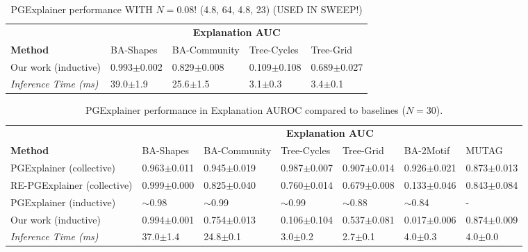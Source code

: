 \begin{table}[ht]
    \centering
    \scriptsize
    \begin{tabularx}{\textwidth}{l*{4}{X}}   %
    \toprule
    \textbf{} & \multicolumn{4}{c}{\textbf{Explanation AUC}} \\
    \cmidrule{2-5}
    \textbf{Method} & BA-Shapes & BA-Community & Tree-Cycles & Tree-Grid \\
    \midrule
    Our work (inductive) & 0.993$\pm$0.002 & 0.829$\pm$0.008 & 0.109$\pm$0.108 & 0.689$\pm$0.027 \\
    \addlinespace
    \midrule
    \midrule
    \textit{Inference Time (ms)} & 39.0$\pm$1.9 & 25.6$\pm$1.5 & 3.1$\pm$0.3 & 3.4$\pm$0.1 \\
    \bottomrule
    \end{tabularx}
    \caption{PGExplainer performance WITH $N=0.08$! (4.8, 64, 4.8, 23) (USED IN SWEEP!)}
    \label{tab:pgexplainer_auc}
\end{table}

\begin{table}[ht]
    \centering
    \scriptsize
    \begin{tabularx}{\textwidth}{l*{6}{X}}   %
    \toprule
    \textbf{} & \multicolumn{6}{c}{\textbf{Explanation AUC}} \\
    \cmidrule{2-7}
    \textbf{Method} & BA-Shapes & BA-Community & Tree-Cycles & Tree-Grid & BA-2Motif & MUTAG \\
    \midrule
    PGExplainer (collective) & 0.963$\pm$0.011 & 0.945$\pm$0.019 & 0.987$\pm$0.007 & 0.907$\pm$0.014 & 0.926$\pm$0.021 & 0.873$\pm$0.013 \\
    \midrule
    RE-PGExplainer (collective) & 0.999$\pm$0.000 & 0.825$\pm$0.040 & 0.760$\pm$0.014 & 0.679$\pm$0.008 & 0.133$\pm$0.046 & 0.843$\pm$0.084 \\
    \midrule
    PGExplainer (inductive) & $\sim$0.98 & $\sim$0.99 & $\sim$0.99 & $\sim$0.88 & $\sim$0.84 & - \\
    \midrule
    Our work (inductive) & 0.994$\pm$0.001 & 0.754$\pm$0.013 & 0.106$\pm$0.104 & 0.537$\pm$0.081 & 0.017$\pm$0.006 & 0.874$\pm$0.009 \\
    \addlinespace
    \midrule
    \midrule
    \textit{Inference Time (ms)} & 37.0$\pm$1.4 & 24.8$\pm$0.1 & 3.0$\pm$0.2 & 2.7$\pm$0.1 & 4.0$\pm$0.3 & 4.0$\pm$0.0 \\
    \bottomrule
    \end{tabularx}
    \caption{PGExplainer performance in Explanation AUROC compared to baselines ($N=30$).}
    \label{tab:pgexplainer_auc}
\end{table}

